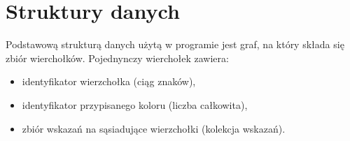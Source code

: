 \section{Struktury danych}
Podstawową strukturą danych użytą w programie jest graf, na który składa się zbiór wierchołków.
Pojednynczy wierchołek zawiera:
\begin{itemize}
 \item identyfikator wierzchołka (ciąg znaków),
 \item identyfikator przypisanego koloru (liczba całkowita),
 \item zbiór wskazań na sąsiadujące wierzchołki (kolekcja wskazań).
\end{itemize}
